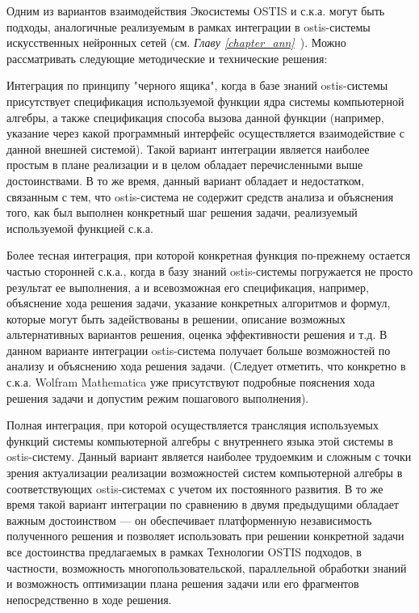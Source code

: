 Одним из вариантов взаимодействия Экосистемы OSTIS и с.к.а. могут быть подходы, аналогичные реализуемым в рамках интеграции в ostis-системы искусственных нейронных сетей (см. \textit{Главу \ref{chapter_ann}~}). Можно рассматривать следующие методические и технические решения:
\begin{textitemize}
	\item Интеграция по принципу "черного ящика"{}, когда в базе знаний ostis-системы присутствует спецификация используемой функции ядра системы компьютерной алгебры, а также спецификация способа вызова данной функции (например, указание через какой программный интерфейс осуществляется взаимодействие с данной внешней системой). Такой вариант интеграции является наиболее простым в плане реализации и в целом обладает перечисленными выше достоинствами. В то же время, данный вариант обладает и недостатком, связанным с тем, что ostis-система не содержит средств анализа и объяснения того, как был выполнен конкретный шаг решения задачи, реализуемый используемой функцией с.к.а.
	\item Более тесная интеграция, при которой конкретная функция по-прежнему остается частью сторонней с.к.а., когда в базу знаний ostis-системы погружается не просто результат ее выполнения, а и всевозможная его спецификация, например, объяснение хода решения задачи, указание конкретных алгоритмов и формул, которые могут быть задействованы в решении, описание возможных альтернативных вариантов решения, оценка эффективности решения и т.д. В данном варианте интеграции ostis-система получает больше возможностей по анализу и объяснению хода решения задачи. (Следует отметить, что конкретно в с.к.а. Wolfram Mathematica уже присутствуют подробные пояснения хода решения задачи и допустим режим пошагового выполнения).
	\item Полная интеграция, при которой осуществляется трансляция используемых функций системы компьютерной алгебры с внутреннего языка этой системы в ostis-систему. Данный вариант является наиболее трудоемким и сложным с точки зрения актуализации реализации возможностей систем компьютерной алгебры в соответствующих ostis-системах с учетом их постоянного развития. В то же время такой вариант интеграции по сравнению в двумя предыдущими обладает важным достоинством --- он обеспечивает платформенную независимость полученного решения и позволяет использовать при решении конкретной задачи все достоинства предлагаемых в рамках Технологии OSTIS подходов, в частности, возможность многопользовательской, параллельной обработки знаний и возможность оптимизации плана решения задачи или его фрагментов непосредственно в ходе решения.
\end{textitemize}

